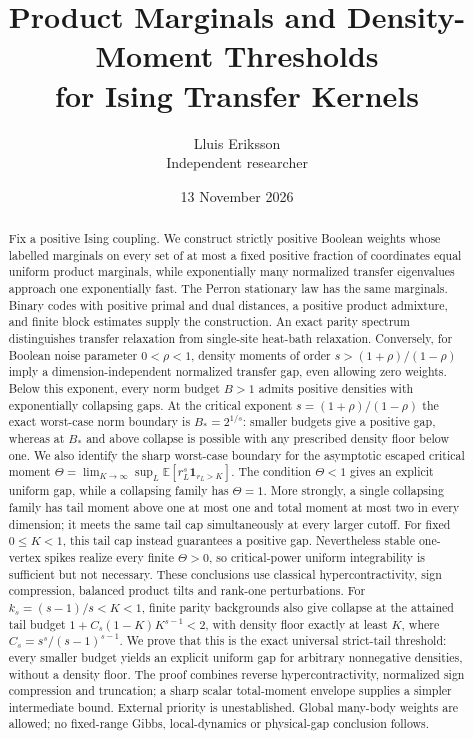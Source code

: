 \documentclass[11pt]{article}
\title{Product Marginals and Density-Moment Thresholds\\for Ising Transfer Kernels}
\author{Lluis Eriksson\\\small Independent researcher}
\date{13 November 2026}
\begin{document}
\maketitle
\begin{abstract}
Fix a positive Ising coupling. We construct strictly positive Boolean
weights whose labelled marginals on every set of at most a fixed positive
fraction of coordinates equal uniform product marginals, while exponentially
many normalized transfer eigenvalues approach one exponentially fast.
The Perron stationary law has the same marginals. Binary codes with positive
primal and dual distances, a positive product admixture, and finite block
estimates supply the construction. An exact parity spectrum distinguishes
transfer relaxation from single-site heat-bath relaxation.
Conversely, for Boolean noise parameter $0<\rho<1$, density moments of order
$s>(1+\rho)/(1-\rho)$ imply a dimension-independent normalized transfer gap,
even allowing zero weights. Below this exponent, every norm budget $B>1$
admits positive densities with exponentially collapsing gaps.
At the critical exponent $s=(1+\rho)/(1-\rho)$ the exact worst-case norm
boundary is $B_*=2^{1/s}$: smaller budgets give a positive gap, whereas
at $B_*$ and above collapse is possible with any prescribed density floor
below one. We also identify the sharp worst-case boundary for the
asymptotic escaped critical moment
$\Theta=\lim_{K\to\infty}\sup_L\mathbb E[r_L^s\mathbf1_{r_L>K}]$.
The condition $\Theta<1$ gives an explicit uniform gap, while a collapsing
family has $\Theta=1$. More strongly, a single collapsing family has tail moment above one
at most one and total moment at most two in every dimension; it meets
the same tail cap simultaneously at every larger cutoff. For fixed
$0\le K<1$, this tail cap instead guarantees a positive gap. Nevertheless stable one-vertex spikes realize every
finite $\Theta>0$, so critical-power uniform integrability is sufficient
but not necessary. These conclusions use classical hypercontractivity,
sign compression, balanced product tilts and rank-one perturbations.
For $k_s=(s-1)/s<K<1$, finite parity backgrounds also give collapse
at the attained tail budget $1+C_s(1-K)K^{s-1}<2$,
with density floor exactly at least $K$, where
$C_s=s^s/(s-1)^{s-1}$. We prove that this is the exact universal
strict-tail threshold: every smaller budget yields an explicit uniform
gap for arbitrary nonnegative densities, without a density floor.
The proof combines reverse hypercontractivity, normalized sign compression
and truncation; a sharp scalar total-moment envelope supplies a simpler
intermediate bound. External priority is unestablished. Global many-body weights are allowed;
no fixed-range Gibbs, local-dynamics or physical-gap conclusion follows.
\end{abstract}
\end{document}
